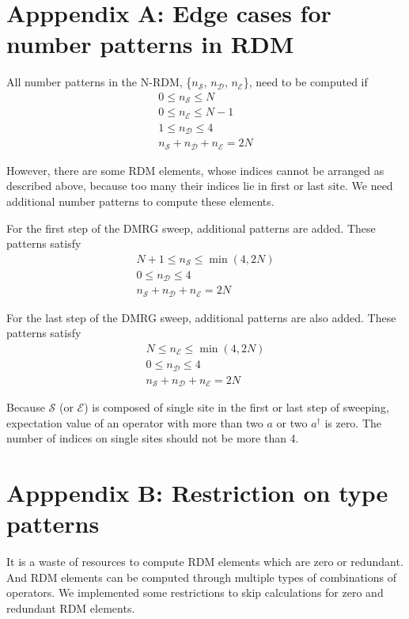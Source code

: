 \section*{Apppendix A: Edge cases for number patterns in RDM}
All number patterns in the N-RDM, \{$n_\mathcal{S}$, $n_\mathcal{D}$, $n_\mathcal{E}$\}, need to be computed if 
\begin{align}
0\le n_\mathcal{S} \le N \\
0\le n_\mathcal{E} \le N-1 \\
1\le n_\mathcal{D} \le 4 \\
n_\mathcal{S} +n_\mathcal{D} +n_\mathcal{E} =2N
\end{align}

However, there are some RDM elements, whose indices cannot be arranged as described above, because too many their indices lie in first or last site. We need additional number patterns to compute these elements.

For the first step of the DMRG sweep, additional patterns are added. These patterns satisfy
\begin{align}
N+1\le n_\mathcal{S} \le \min(4,2N) \\
0\le n_\mathcal{D} \le 4 \\
n_\mathcal{S} +n_\mathcal{D} +n_\mathcal{E} =2N 
\end{align}

For the last step of the DMRG sweep, additional patterns are also added. These patterns satisfy
\begin{align}
N\le n_\mathcal{E} \le \min(4,2N) \\
0\le n_\mathcal{D} \le 4 \\
n_\mathcal{S} +n_\mathcal{D} +n_\mathcal{E} =2N
\end{align}

Because $\mathcal{S}$ (or $\mathcal{E}$) is composed of single site in the first or last step of sweeping, expectation value of an operator with more than two $a$ or two $a^\dagger$ is zero. The number of indices on single sites should not be more than 4.

\section*{Apppendix B: Restriction on type patterns}
It is a waste of resources to compute RDM elements which are zero or redundant. And RDM elements can be computed through multiple types of combinations of operators. We implemented some restrictions to skip calculations for zero and redundant RDM elements.

